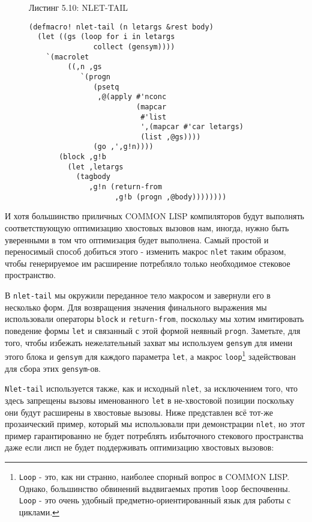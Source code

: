 \begin{figure}Листинг 5.10: NLET-TAIL\label{listing_5.10}
\listbegin
\begin{verbatim}
(defmacro! nlet-tail (n letargs &rest body)
  (let ((gs (loop for i in letargs
               collect (gensym))))
    `(macrolet
         ((,n ,gs
            `(progn
               (psetq
                ,@(apply #'nconc
                         (mapcar
                          #'list
                          ',(mapcar #'car letargs)
                          (list ,@gs))))
               (go ,',g!n))))
       (block ,g!b
         (let ,letargs
           (tagbody
              ,g!n (return-from
                    ,g!b (progn ,@body))))))))
\end{verbatim}
\listend
\end{figure}

И хотя большинство приличных COMMON LISP компиляторов будут выполнять соответствующую оптимизацию хвостовых вызовов нам, иногда, нужно быть уверенными в том что оптимизация будет выполнена. Самый простой и переносимый способ добиться этого - изменить макрос \verb"nlet" таким образом, чтобы генерируемое им расширение потребляло только необходимое стековое пространство.

В \verb"nlet-tail" мы окружили переданное тело макросом и завернули его в несколько форм. Для возвращения значения финального выражения мы использовали операторы \verb"block" и \verb"return-from", поскольку мы хотим имитировать поведение формы \verb"let" и связанный с этой формой неявный \verb"progn". Заметьте, для того, чтобы избежать нежелательный захват мы используем \verb"gensym" для имени этого блока и \verb"gensym" для каждого параметра \verb"let", а макрос \verb"loop"\footnote{\verb"Loop" - это, как ни странно, наиболее спорный вопрос в COMMON LISP. Однако, большинство обвинений выдвигаемых против \verb"loop" беспочвенны. \verb"Loop" - это очень удобный предметно-ориентированный язык для работы с циклами.} задействован для сбора этих \verb"gensym"-ов.



\verb"Nlet-tail" используется также, как и исходный \verb"nlet", за исключением того, что здесь запрещены вызовы именованного \verb"let" в не-хвостовой позиции поскольку они будут расширены в хвостовые вызовы. Ниже представлен всё тот-же прозаический пример, который мы использовали при демонстрации \verb"nlet", но этот пример гарантированно не будет потреблять избыточного стекового пространства даже если лисп не будет поддерживать оптимизацию хвостовых вызовов:

